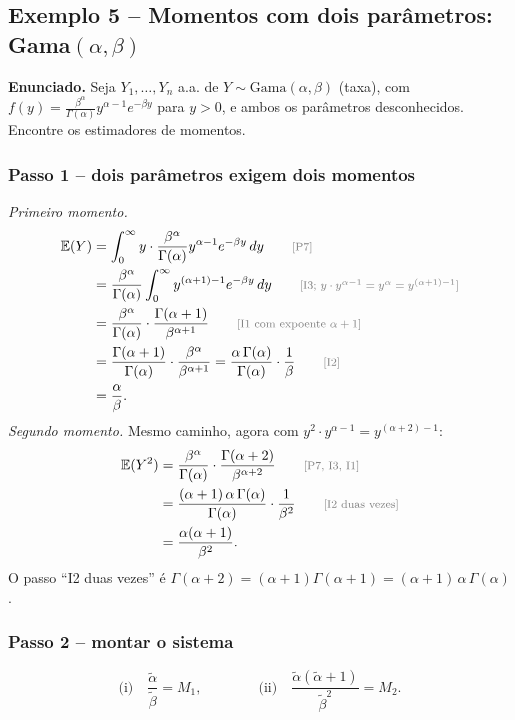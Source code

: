 \documentclass[11pt,a4paper]{article}
\theoremstyle{definition}
\theoremstyle{plain}
\newcommand{\E}{\mathbb{E}}
\newcommand{\just}[1]{\tag*{\footnotesize\textcolor{gray}{[#1]}}}
\begin{document}
\subsection{Exemplo 5 -- Momentos com dois parâmetros: Gama$(\alpha,\beta)$}\label{ex:gama2}

\textbf{Enunciado.} Seja $Y_1,\dots,Y_n$ a.a. de $Y\sim\text{Gama}(\alpha,\beta)$ (taxa), com $f(y)=\frac{\beta^\alpha}{\Gamma(\alpha)}y^{\alpha-1}e^{-\beta y}$ para $y>0$, e ambos os parâmetros desconhecidos. Encontre os estimadores de momentos.

\subsubsection*{Passo 1 -- dois parâmetros exigem dois momentos}
\textit{Primeiro momento.}
\begin{align*}
\E(Y)&=\int_0^\infty y\cdot\frac{\beta^\alpha}{\Gamma(\alpha)}y^{\alpha-1}e^{-\beta y}\,dy \just{P7}\\
&=\frac{\beta^\alpha}{\Gamma(\alpha)}\int_0^\infty y^{(\alpha+1)-1}e^{-\beta y}\,dy \just{I3; $y\cdot y^{\alpha-1}=y^{\alpha}=y^{(\alpha+1)-1}$}\\
&=\frac{\beta^\alpha}{\Gamma(\alpha)}\cdot\frac{\Gamma(\alpha+1)}{\beta^{\alpha+1}} \just{I1 com expoente $\alpha+1$}\\
&=\frac{\Gamma(\alpha+1)}{\Gamma(\alpha)}\cdot\frac{\beta^\alpha}{\beta^{\alpha+1}}
=\frac{\alpha\,\Gamma(\alpha)}{\Gamma(\alpha)}\cdot\frac1\beta \just{I2}\\
&=\frac\alpha\beta .
\end{align*}
\textit{Segundo momento.} Mesmo caminho, agora com $y^2\cdot y^{\alpha-1}=y^{(\alpha+2)-1}$:
\begin{align*}
\E(Y^2)&=\frac{\beta^\alpha}{\Gamma(\alpha)}\cdot\frac{\Gamma(\alpha+2)}{\beta^{\alpha+2}} \just{P7, I3, I1}\\
&=\frac{(\alpha+1)\,\alpha\,\Gamma(\alpha)}{\Gamma(\alpha)}\cdot\frac{1}{\beta^2} \just{I2 duas vezes}\\
&=\frac{\alpha(\alpha+1)}{\beta^2}.
\end{align*}
O passo ``I2 duas vezes'' é $\Gamma(\alpha+2)=(\alpha+1)\Gamma(\alpha+1)=(\alpha+1)\,\alpha\,\Gamma(\alpha)$.

\subsubsection*{Passo 2 -- montar o sistema}
\[
\text{(i)}\quad\frac{\tilde\alpha}{\tilde\beta}=M_1,
\qquad\qquad
\text{(ii)}\quad\frac{\tilde\alpha(\tilde\alpha+1)}{\tilde\beta^2}=M_2 .
\]
\end{document}
